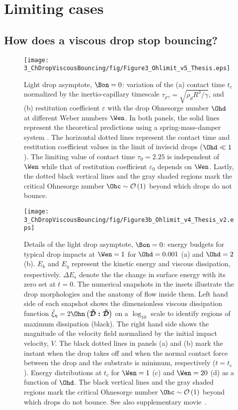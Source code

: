 \section{Limiting cases}\label{sec:LimitingCases}
\subsection{How does a viscous drop stop bouncing?}\label{sec:LimitingCases:Oh}
\begin{figure}
	\centering
	\texttt{[image: 3\_ChDropViscousBouncing/fig/Figure3\_Ohlimit\_v5\_Thesis.eps]}
	\caption{Light drop asymptote, $\Bon = 0$: variation of the (a) contact time $t_c$ normalized by the inertio-capillary timescale $\tau_{\rho\gamma} = \sqrt{\rho_dR^3/\gamma}$, and (b) restitution coefficient $\varepsilon$ with the drop Ohnesorge number $\Ohd$ at different Weber numbers $\Wen$. In both panels, the solid lines represent the theoretical predictions using a spring-mass-damper system \citep[contact time, equation~\eqref{eqn:JhaEtAl_time} and restitution coefficient, equation~\eqref{eqn:JhaEtAl_epsilon},][]{jha2020viscous}. The horizontal dotted lines represent the contact time and restitution coefficient values in the limit of inviscid drops ($\Ohd \ll 1$). The limiting value of contact time $\tau_0 = 2.25$ is independent of $\Wen$ while that of restitution coefficient $\varepsilon_0$ depends on $\Wen$. Lastly, the dotted black vertical lines and the gray shaded regions mark the critical Ohnesorge number $\Ohc \sim \mathcal{O}\left(1\right)$ beyond which drops do not bounce.}
	\label{fig:Ohlim}
\end{figure}
\begin{figure}
	\centering
	\texttt{[image: 3\_ChDropViscousBouncing/fig/Figure3b\_Ohlimit\_v4\_Thesis\_v2.eps]}
	\caption{Details of the light drop asymptote, $\Bon = 0$: energy budgets for typical drop impacts at $\Wen = 1$ for $\Ohd = 0.001$ (a) and $\Ohd =  2$ (b). $E_k$ and $E_\eta$ represent the kinetic energy and viscous dissipation, respectively. $\Delta E_s$ denote the the change in surface energy with its zero set at $t = 0$. The numerical snapshots in the insets illustrate the drop morphologies and the anatomy of flow inside them. Left hand side of each snapshot shows the dimensionless viscous dissipation function $\tilde{\xi}_\eta = 2\Ohn\left(\boldsymbol{\tilde{\mathcal{D}}:\tilde{\mathcal{D}}}\right)$ on a $\log_{10}$ scale to identify regions of maximum dissipation (black). The right hand side shows the magnitude of the velocity field normalized by the initial impact velocity, $V$. The black dotted lines in panels (a) and (b) mark the instant when the drop takes off and when the normal contact force between the drop and the substrate is minimum, respectively ($t = t_c$). Energy distributions at $t_c$ for $\Wen = 1$ (c)  and $\Wen = 20$ (d) as a function of $\Ohd$. The black vertical lines and the gray shaded regions mark the critical Ohnesorge number $\Ohc \sim \mathcal{O}\left(1\right)$ beyond which drops do not bounce. See also supplementary movie~.}
	\label{fig:OhlimDescription}
\end{figure}

